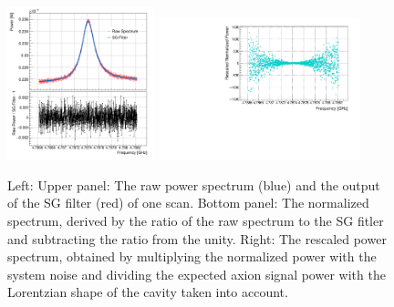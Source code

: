 \begin{figure} [htbp]
  \centering
  \includegraphics[width=0.38\textwidth,height = 0.4\textwidth]{figures/RawPower_SGPower_Ratio_vs_Freq_Step_0100.png}
  \includegraphics[width=0.52\textwidth,height = 0.4\textwidth]{figures/RescaledPower_vs_Freq_Step_0100.pdf}
  \caption{Left: Upper panel: The raw power spectrum (blue) and the output of 
the SG filter (red) of one scan. Bottom panel: The normalized spectrum,  
derived by the ratio of the raw spectrum to the SG fitler and subtracting 
the ratio from the unity.
  Right: The rescaled power spectrum, obtained by multiplying the normalized 
power with the system noise and dividing the expected axion signal power 
with the Lorentzian shape of the cavity taken into account.}
  \label{fig:raw_sg_power}
\end{figure}





